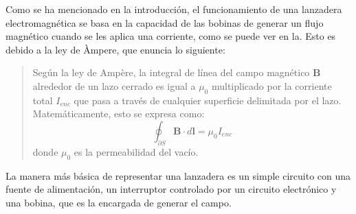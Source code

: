 Como se ha mencionado en la introducción, el funcionamiento de una lanzadera electromagnética se basa en la capacidad de las bobinas de generar un flujo magnético cuando se les aplica una corriente, como se puede ver en la. Esto es debido a la ley de Àmpere, que enuncia lo siguiente:

\begin{quote}
    Según la ley de Ampère, la integral de línea del campo magnético \(\mathbf{B}\) alrededor de un lazo cerrado es igual a \(\mu_0\) multiplicado por la corriente total \(I_{enc}\) que pasa a través de cualquier superficie delimitada por el lazo. Matemáticamente, esto se expresa como:
    \[
    \oint_{\partial S} \mathbf{B} \cdot d\mathbf{l} = \mu_0 I_{enc}
    \]
    donde \(\mu_0\) es la permeabilidad del vacío.
\end{quote}

La manera más básica de representar una lanzadera es un simple circuito con una fuente de alimentación, un interruptor controlado por un circuito electrónico y una bobina, que es la encargada de generar el campo.